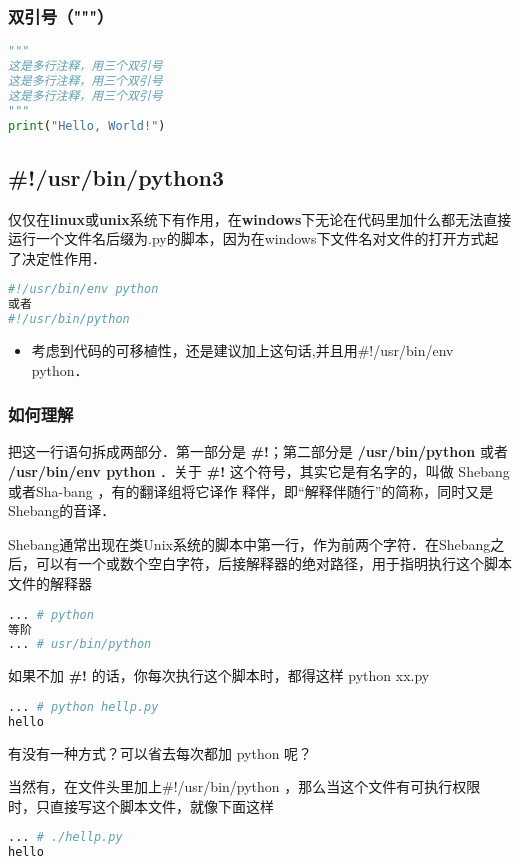 \subsubsection{双引号（"""）}
\begin{lstlisting}[language=python]
"""
这是多行注释，用三个双引号
这是多行注释，用三个双引号 
这是多行注释，用三个双引号
"""
print("Hello, World!")
\end{lstlisting}

\subsection{#!/usr/bin/python3 }\label{Pynot1_sub3}
仅仅在\textbf{linux}或\textbf{unix}系统下有作用，在\textbf{windows}下无论在代码里加什么都无法直接运行一个文件名后缀为.py的脚本，因为在windows下文件名对文件的打开方式起了决定性作用．
\begin{lstlisting}[language=python]
#!/usr/bin/env python
或者
#!/usr/bin/python
\end{lstlisting}
\begin{itemize}
\item 考虑到代码的可移植性，还是建议加上这句话,并且用#!/usr/bin/env python．
\end{itemize}

\subsubsection{如何理解}
把这一行语句拆成两部分．第一部分是 \textbf{#!}；第二部分是 \textbf{/usr/bin/python} 或者 \textbf{/usr/bin/env python} ．关于 \textbf{#!} 这个符号，其实它是有名字的，叫做 Shebang 或者Sha-bang ，有的翻译组将它译作 释伴，即“解释伴随行”的简称，同时又是Shebang的音译．

Shebang通常出现在类Unix系统的脚本中第一行，作为前两个字符．在Shebang之后，可以有一个或数个空白字符，后接解释器的绝对路径，用于指明执行这个脚本文件的解释器
\begin{lstlisting}[language=bash]
... # python
等阶
... # usr/bin/python
\end{lstlisting}

如果不加 \textbf{#!} 的话，你每次执行这个脚本时，都得这样 python xx.py
\begin{lstlisting}[language=bash]
... # python hellp.py
hello
\end{lstlisting}

有没有一种方式？可以省去每次都加 python 呢？

当然有，在文件头里加上#!/usr/bin/python ，那么当这个文件有可执行权限 时，只直接写这个脚本文件，就像下面这样
\begin{lstlisting}[language=bash]
... # ./hellp.py
hello
\end{lstlisting}

